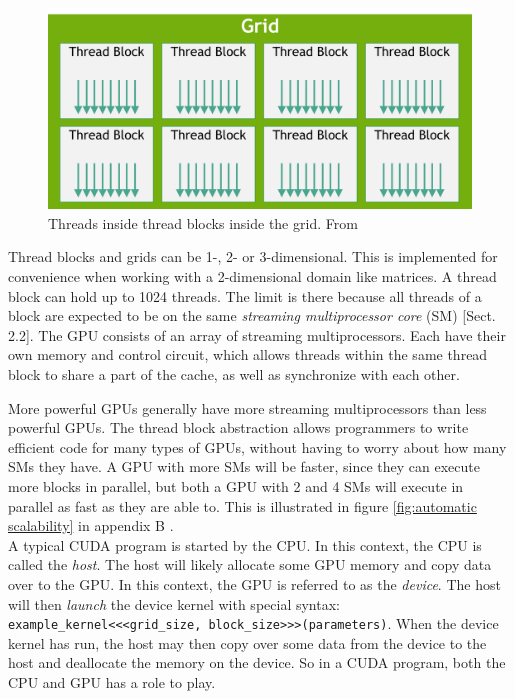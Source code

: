 \begin{figure}[ht]
\includegraphics[width=\textwidth]{Documents/Report/Figures/Threads and blocks.png}
\caption{Threads inside thread blocks inside the grid. From \cite{nvidia:cudadoc}}
\label{fig:threads and blocks}
\end{figure}

Thread blocks and grids can be 1-, 2- or 3-dimensional. This is implemented for convenience when working with a 2-dimensional domain like matrices. A thread block can hold up to 1024 threads. The limit is there because all threads of a block are expected to be on the same \textit{streaming multiprocessor core} (SM) [Sect. 2.2]\cite{nvidia:cudadoc}. The GPU consists of an array of streaming multiprocessors. Each have their own memory and control circuit, which allows threads within the same thread block to share a part of the cache, as well as synchronize with each other. 

More powerful GPUs generally have more streaming multiprocessors than less powerful GPUs. The thread block abstraction allows programmers to write efficient code for many types of GPUs, without having to worry about how many SMs they have. A GPU with more SMs will be faster, since they can execute more blocks in parallel, but both a GPU with 2 and 4 SMs will execute in parallel as fast as they are able to. This is illustrated in figure \ref{fig:automatic scalability} in appendix B \cite[Sect. 1.3]{nvidia:cudadoc}.\\

\noindent A typical CUDA program is started by the CPU. In this context, the CPU is called the \textit{host}. The host will likely allocate some GPU memory and copy data over to the GPU. In this context, the GPU is referred to as the \textit{device}. The host will then \textit{launch} the device kernel with special syntax: \texttt{example\_kernel<<<grid\_size, block\_size>>>(parameters)}. When the device kernel has run, the host may then copy over some data from the device to the host and deallocate the memory on the device. So in a CUDA program, both the CPU and GPU has a role to play. 

